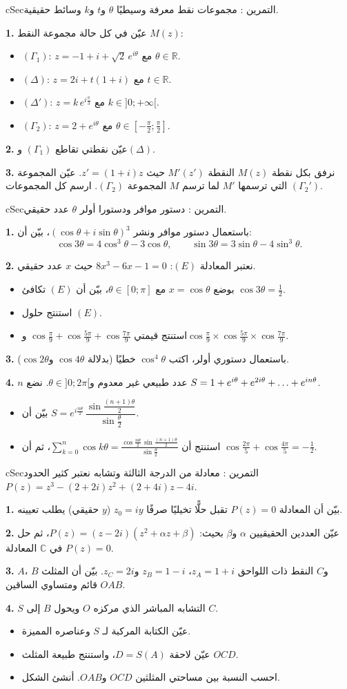 \documentclass[12pt,a4paper]{article}
\newenvironment{BOX}[2]{\begin{otherlanguage}{english}\begin{arbox}{#1}{#2}}{\end{arbox}\end{otherlanguage}}
\newcounter{exo}
\newenvironment{tamrin}[1]{\stepcounter{exo}\begin{BOX}{cSec}{التمرين \theexo: #1}}{\end{BOX}}
\renewcommand{\dots}{\mathinner{\ldotp\ldotp\ldotp}}
\newcommand{\R}{\mathbb{R}}
\newenvironment{sq}{\begin{itemize}[leftmargin=2.4em,itemsep=3pt]}{\end{itemize}}
\newcommand{\qa}{\item[(أ)]}\newcommand{\qb}{\item[(ب)]}\newcommand{\qc}{\item[(جـ)]}\newcommand{\qd}{\item[(د)]}\newcommand{\qe}{\item[(هـ)]}
\newcommand{\QQ}[1]{\par\smallskip\textbf{#1.} }
\begin{document}
\begin{tamrin}{مجموعات نقط معرفة وسيطيًا}
$\theta$ و$t$ و$k$ وسائط حقيقية.
\QQ{1} عيّن في كل حالة مجموعة النقط $M(z)$:
\begin{sq}
\qa $(\Gamma_1)$: $z=-1+i+\sqrt2\,e^{i\theta}$ مع $\theta\in\R$.
\qb $(\Delta)$: $z=2i+t(1+i)$ مع $t\in\R$.
\qc $(\Delta')$: $z=k\,e^{i\frac\pi3}$ مع $k\in]0;+\infty[$.
\qd $(\Gamma_2)$: $z=2+e^{i\theta}$ مع $\theta\in\left[-\frac\pi2;\frac\pi2\right]$.
\end{sq}
\QQ{2} عيّن نقطتي تقاطع $(\Gamma_1)$ و$(\Delta)$.
\QQ{3} نرفق بكل نقطة $M(z)$ النقطة $M'(z')$ حيث $z'=(1+i)z$. عيّن المجموعة $(\Gamma_2')$ التي ترسمها $M'$ لما ترسم $M$ المجموعة $(\Gamma_2)$. ارسم كل المجموعات.
\end{tamrin}

\begin{tamrin}{دستور موافر ودستورا أولر}
$\theta$ عدد حقيقي.
\QQ{1} باستعمال دستور موافر ونشر $(\cos\theta+i\sin\theta)^3$، بيّن أن:
\[\cos3\theta=4\cos^3\theta-3\cos\theta,\qquad \sin3\theta=3\sin\theta-4\sin^3\theta.\]
\QQ{2} نعتبر المعادلة $(E)$: $8x^3-6x-1=0$ حيث $x$ عدد حقيقي.
\begin{sq}
\qa بوضع $x=\cos\theta$ مع $\theta\in[0;\pi]$، بيّن أن $(E)$ تكافئ $\cos3\theta=\frac12$.
\qb استنتج حلول $(E)$.
\qc استنتج قيمتي $\cos\frac\pi9+\cos\frac{5\pi}9+\cos\frac{7\pi}9$ و$\cos\frac\pi9\times\cos\frac{5\pi}9\times\cos\frac{7\pi}9$.
\end{sq}
\QQ{3} باستعمال دستوري أولر، اكتب $\cos^4\theta$ خطيًا (بدلالة $\cos4\theta$ و$\cos2\theta$).
\QQ{4} $n$ عدد طبيعي غير معدوم و$\theta\in]0;2\pi[$. نضع $S=1+e^{i\theta}+e^{2i\theta}+\dots+e^{in\theta}$.
\begin{sq}
\qa بيّن أن $S=e^{i\frac{n\theta}2}\,\dfrac{\sin\frac{(n+1)\theta}{2}}{\sin\frac\theta2}$.
\qb استنتج أن $\displaystyle\sum_{k=0}^n\cos k\theta=\frac{\cos\frac{n\theta}2\,\sin\frac{(n+1)\theta}2}{\sin\frac\theta2}$، ثم أن $\cos\frac{2\pi}5+\cos\frac{4\pi}5=-\frac12$.
\end{sq}
\end{tamrin}

\begin{tamrin}{معادلة من الدرجة الثالثة وتشابه}
نعتبر كثير الحدود $P(z)=z^3-(2+2i)z^2+(2+4i)z-4i$.
\QQ{1} بيّن أن المعادلة $P(z)=0$ تقبل حلًّا تخيليًا صرفًا $z_0=iy$ ($y$ حقيقي) يطلب تعيينه.
\QQ{2} عيّن العددين الحقيقيين $\alpha$ و$\beta$ بحيث: $P(z)=(z-2i)(z^2+\alpha z+\beta)$، ثم حل في $\mathbb{C}$ المعادلة $P(z)=0$.
\QQ{3} $A$، $B$ و$C$ النقط ذات اللواحق $z_A=1+i$، $z_B=1-i$ و$z_C=2i$. بيّن أن المثلث $OAB$ قائم ومتساوي الساقين.
\QQ{4} $S$ التشابه المباشر الذي مركزه $O$ ويحول $B$ إلى $C$.
\begin{sq}
\qa عيّن الكتابة المركبة لـ $S$ وعناصره المميزة.
\qb عيّن لاحقة $D=S(A)$، واستنتج طبيعة المثلث $OCD$.
\qc احسب النسبة بين مساحتي المثلثين $OCD$ و$OAB$. أنشئ الشكل.
\end{sq}
\end{tamrin}
\end{document}
